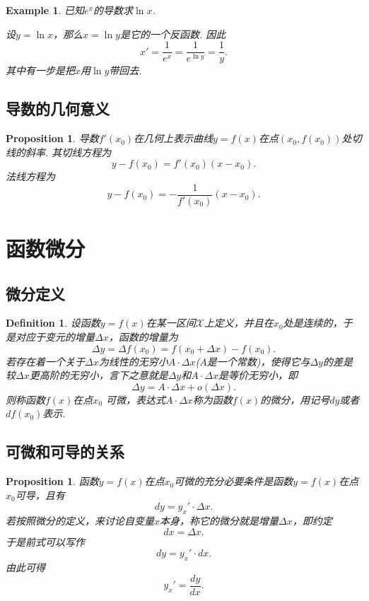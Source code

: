 \documentclass{article}
\newtheorem{proposition}[theorem]{Proposition}
\newtheorem{example}[theorem]{Example}
\newtheorem{definition}[theorem]{Definition}
\begin{document}
\begin{example}
\rm 已知$e^x$的导数求$\ln x$.

设$y = \ln x$，那么$x = \ln y$是它的一个反函数. 因此
$$
x' = \frac{1}{e^x} = \frac{1}{e^{\ln y}} = \frac{1}{y}.
$$
其中有一步是把$x$用$\ln y$带回去. 
\end{example}

\subsection{导数的几何意义}

\begin{proposition}
\rm 导数$f'(x_0)$在几何上表示曲线$y=f(x)$在点$(x_0,f(x_0))$处切线的斜率. 其切线方程为
$$
y-f(x_0) = f'(x_0)(x-x_0).
$$
法线方程为
$$
y-f(x_0) = -\frac{1}{f'(x_0)}(x-x_0).
$$
\end{proposition}



\newpage
\section{函数微分}

\subsection{微分定义}
\begin{definition}
\rm 设函数$y=f(x)$在某一区间$\mathcal{X}$上定义，并且在$x_0$处是连续的，于是对应于变元的增量$\Delta x$，函数的增量为
$$
\Delta y = \Delta f(x_0) = f(x_0 + \Delta x) - f(x_0).
$$
若{\color{red}存在着一个关于$\Delta x$为线性的无穷小$A \cdot \Delta x$($A$是一个常数)，使得它与$\Delta y$的差是较$\Delta x$更高阶的无穷小}，{\color{blue}言下之意就是$\Delta y$和$A \cdot \Delta x$是等价无穷小}，即
$$
\Delta y = A \cdot \Delta x + o(\Delta x).
$$
则称函数$f(x)$在点$x_0$ {\color{red}可微}，表达式$A \cdot \Delta x$称为函数$f(x)$的{\color{red}微分}，用记号$dy$或者$df(x_0)$表示.
\end{definition}


\subsection{可微和可导的关系}

\begin{proposition}
\rm 函数$y=f(x)$在点$x_0$可微的充分必要条件是函数$y=f(x)$在点$x_0$可导，且有
$$
dy = y_x' \cdot \Delta x.
$$
若按照微分的定义，来讨论自变量$x$本身，称它的微分就是增量$\Delta x$，即约定
$$
dx = \Delta x.
$$
于是前式可以写作
$$
dy = y_x' \cdot dx.
$$
由此可得
$$
y_x' = \frac{dy}{dx}.
$$
\end{proposition}
\end{document}
